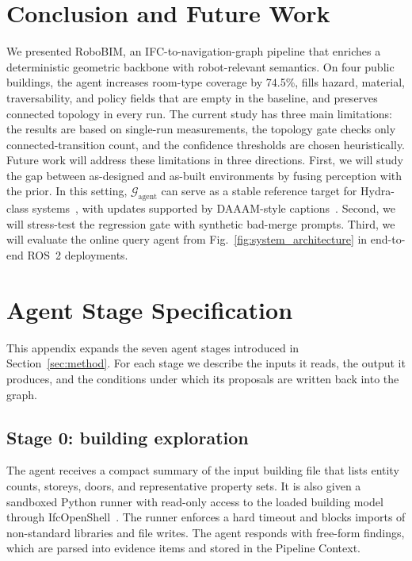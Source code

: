 \documentclass[a4paper, 10pt, conference]{ieeeconf}
\begin{document}
\section{Conclusion and Future Work}
\label{sec:outlook}

We presented RoboBIM, an IFC-to-navigation-graph pipeline that enriches a deterministic geometric backbone with robot-relevant semantics. On four public buildings, the agent increases room-type coverage by 74.5\%, fills hazard, material, traversability, and policy fields that are empty in the baseline, and preserves connected topology in every run. The current study has three main limitations: the results are based on single-run measurements, the topology gate checks only connected-transition count, and the confidence thresholds are chosen heuristically. Future work will address these limitations in three directions. First, we will study the gap between as-designed and as-built environments by fusing perception with the prior. In this setting, $\mathcal{G}_{\text{agent}}$ can serve as a stable reference target for Hydra-class systems~\cite{hughes2024hydra}, with updates supported by DAAAM-style captions~\cite{gorlo2025daaam}. Second, we will stress-test the regression gate with synthetic bad-merge prompts. Third, we will evaluate the online query agent from Fig.~\ref{fig:system_architecture} in end-to-end ROS~2 deployments.


{\footnotesize
}

\appendix

\section{Agent Stage Specification}
\label{app:stages}

This appendix expands the seven agent stages introduced in Section~\ref{sec:method}. For each stage we describe the inputs it reads, the output it produces, and the conditions under which its proposals are written back into the graph.

\subsection{Stage 0: building exploration}
The agent receives a compact summary of the input building file that lists entity counts, storeys, doors, and representative property sets. It is also given a sandboxed Python runner with read-only access to the loaded building model through IfcOpenShell~\cite{ifcopenshell}. The runner enforces a hard timeout and blocks imports of non-standard libraries and file writes. The agent responds with free-form findings, which are parsed into evidence items and stored in the Pipeline Context.
\end{document}
